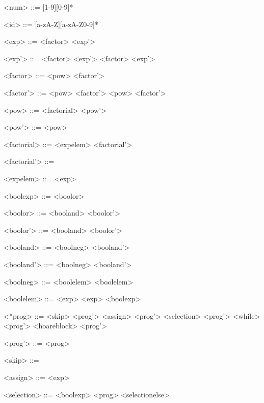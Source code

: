 \begin{grammarEx}
	<num> ::= [1-9][0-9]*
	
	<id> ::= [a-zA-Z][a-zA-Z0-9]*
	
	<exp> ::= <factor> <exp'> 
	
	<exp'> ::= \lit{+} <factor> <exp'> 
	\alt \lit{-} <factor> <exp'> 
	\alt \straightepsilon{} 
	
	<factor> ::= <pow> <factor'> 
	
	<factor'> ::= \lit{*} <pow> <factor'> 
	\alt \lit{/} <pow> <factor'> 
	\alt \straightepsilon{} 
	
	<pow> ::= <factorial> <pow'> 
	
	<pow'> ::= \lit{\^{}} <pow> 
	\alt \straightepsilon{} 
	
	<factorial> ::= <exp\textunderscore elem> <factorial'> 
	
	<factorial'> ::= \lit{!} 
	\alt \straightepsilon{} 
	
	<exp\textunderscore elem> ::=  
	\alt {} 
	\alt \lit{(} <exp> \lit{)} 
	
	<bool\textunderscore exp> ::= <bool\textunderscore or> 
	
	<bool\textunderscore or> ::= <bool\textunderscore and> <bool\textunderscore or'> 
	
	<bool\textunderscore or'> ::= \lit{\textbar\textbar} <bool\textunderscore and> <bool\textunderscore or'> 
	\alt \straightepsilon{} 
	
	<bool\textunderscore and> ::= <bool\textunderscore neg> <bool\textunderscore and'> 
	
	<bool\textunderscore and'> ::= \lit{\&\&} <bool\textunderscore neg> <bool\textunderscore and'> 
	\alt \straightepsilon{} 
	
	<bool\textunderscore neg> ::= <bool\textunderscore elem> 
	\alt \lit{\textasciitilde{}} <bool\textunderscore elem> 
	
	<bool\textunderscore elem> ::= <exp> \lit{\textless{}} <exp> 
	\alt {} 
	\alt \lit{[} <bool\textunderscore exp> \lit{]} 
	
	<*prog> ::= <skip> <prog'> 
	\alt <assign> <prog'> 
	\alt <selection> <prog'> 
	\alt <while> <prog'> 
	\alt <hoare\textunderscore block> <prog'> 
	
	<prog'> ::= \lit{;} <prog> 
	\alt \straightepsilon{} 
	
	<skip> ::=  
	
	<assign> ::=  \lit{=} <exp> 
	
	<selection> ::=  <bool\textunderscore exp>  <prog> <selection\textunderscore else>  
	

\end{grammarEx}
